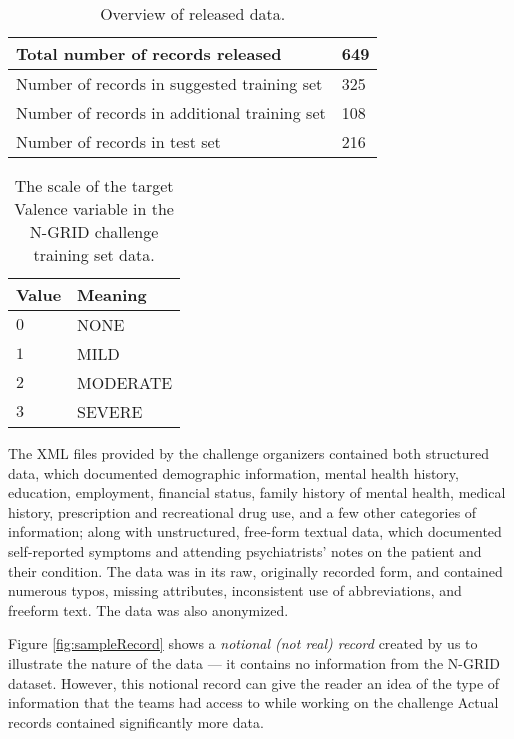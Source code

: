 \begin{table}
    \centering
    \begin{tabular}{|l|l|}
    \hline
    Total number of records released & 649  \\
    \hline
    Number of records in suggested training set    & 325  \\
    \hline
    Number of records in additional training set    & 108  \\
    \hline
    Number of records in test set   & 216 \\
    \hline
    \end{tabular}
    \caption{Overview of released data.}
    \label{tab:data1}
\end{table}


\begin{table}
\centering
    \begin{tabular}{|l|l|}
    \hline
    \textsf{Value} & \textsf{Meaning}\\
    \hline
    $0$  & \textsf{NONE}\\
    $1$  & \textsf{MILD}\\
    $2$  & \textsf{MODERATE}\\
    $3$  & \textsf{SEVERE}\\
    \hline
    \end{tabular}
    \caption{The scale of the target \textsf{Valence} variable in the N-GRID challenge training set data.}
    \label{tab:valence}
\end{table}

The  XML files provided by the challenge organizers contained both structured data, which documented
demographic information, mental health history, education, employment, financial status, family history of mental health, medical history, prescription and recreational drug use, and a few other categories of information; along with unstructured, free-form textual data, which documented self-reported symptoms and attending psychiatrists' notes on the patient and their condition. The data was in its raw, originally recorded form, and contained numerous typos, missing attributes, inconsistent use of abbreviations, and freeform text. The data was also anonymized.

Figure \ref{fig:sampleRecord} shows a \textit{notional (not real) record} created by us to illustrate the nature
of the data --- it contains no
information from the N-GRID dataset. However, this notional record
can give the reader an idea of the type of information that the teams had access to while working on the challenge
Actual records contained significantly more data.

